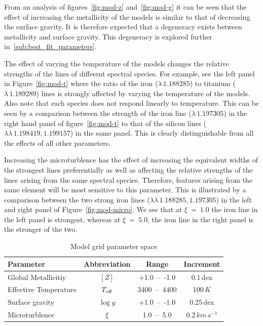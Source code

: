 From an analysis of figures~\ref{fig:mod-z} and~\ref{fig:mod-g} it can be seen that the effect of increasing the metallicity of the models is similar to that of decreasing the surface gravity.
It is therefore expected that a degeneracy exists between metallicity and surface gravity.
This degeneracy is explored further in~\ref{sub:best_fit_parameters}.

The effect of varying the temperature of the models changes the relative strengths of the lines of different spectral species.
For example, see the left panel in Figure~\ref{fig:mod-t} where the ratio of the iron
($\lambda\,1.188285$) to titanium ($\lambda\,1.189289$) lines is strongly affected by varying the temperature of the models.
Also note that each species does not respond linearly to temperature.
This can be seen by a comparison between the strength of the iron line
($\lambda\,1.197305$) in the right hand panel of figure~\ref{fig:mod-t} to that of the silicon lines
($\lambda\lambda\,1.198419, 1.199157$) in the same panel.
This is clearly distinguishable from all the effects of all other parameters.


Increasing the microturblence has the effect of increasing the equivalent widths
of the strongest lines preferentially as well as affecting the relative strengths of the lines arising from the same spectral species.
Therefore, features arising from the same element will be most sensitive to this
parameter.
This is illustrated by a comparison between the two strong iron lines
($\lambda\lambda\,1.188285, 1.197305$) in the left and
right panel of Figure~\ref{fig:mod-micro}.
We see that at $\xi~=~1.0$ the iron line in the left panel is strongest,
whereas at $\xi~=~5.0$, the iron line in the right panel is the stronger of the two.


\begin{table}
\caption{Model grid parameter space\label{tb:grid}}
\scriptsize
\begin{center}
\begin{tabular}{lccc}
 \hline
 \hline
Parameter & Abbreviation & Range & Increment \\
 \hline
Global Metallicitiy & $[Z]$ & +1.0~--~-1.0 & 0.1\,dex \\
Effective Temperature & $T_{\rm eff}$ & 3400~--~4400 & 100\,$K$ \\
Surface gravity & $\log g$ & +1.0~--~-1.0 & 0.25\,dex \\
Microturblence & $\xi$ & 1.0~--~5.0 & 0.2\,$km\,s^{-1}$ \\
 \hline
\end{tabular}
\end{center}
\end{table}


